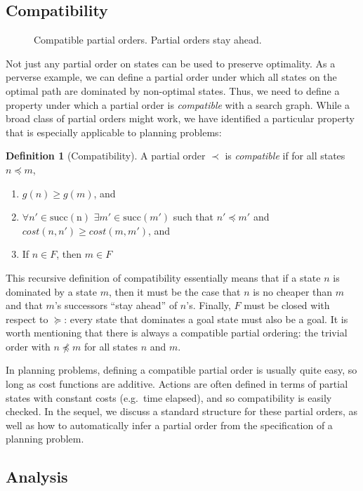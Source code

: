 \documentclass[letterpaper]{article}
\theoremstyle{plain} \newtheorem{theorem}{Theorem} \newtheorem{proposition}{Proposition} \newtheorem{lemma}{Lemma}
\theoremstyle{definition} \newtheorem{definition}{Definition} \newtheorem{conjecture}{Conjecture} \newtheorem*{example}{Example}
\theoremstyle{remark} \newtheorem*{remark}{Remark} \newtheorem*{note}{Note} \newtheorem{case}{Case}
\begin{document}
\subsection{Compatibility}
\begin{figure}
  \caption{Compatible partial orders. Partial orders stay ahead.}
\end{figure}

Not just any partial order on states can be used to preserve optimality. As a perverse
example, we can define a partial order under which all states on the optimal path
are dominated by non-optimal states. Thus, we need to define a property
under which a partial order is \textit{compatible} with a search graph. While
a broad class of partial orders might work, we have identified a particular 
property that is especially applicable to planning problems:

\begin{definition}[Compatibility]
	\label{def-compatibility}
  A partial order $\prec$ is \textit{compatible} if for all states $n \preceq m$,
  \begin{enumerate}
    \item $g(n) \ge g(m)$, and 
    \item $\forall n' \in \mathrm{succ(n)}$ $\exists m' \in
      \mathrm{succ}(m')$ such that $n' \preceq m'$ and
      $cost(n,n') \ge cost(m, m')$, and
    \item If $n \in F$, then $m \in F$
  \end{enumerate}
\end{definition}
This recursive definition of compatibility essentially means that
if a state $n$ is dominated by a state $m$, then it must be the
case that $n$ is no cheaper than $m$ and that $m$'s successors
``stay ahead'' of $n$'s. Finally, $F$ must be closed with respect
to $\succeq$: every state that dominates a goal state must also be
a goal. It is worth mentioning that there is always a compatible
partial ordering: the trivial order with $n \npreceq m$ for all
states $n$ and $m$.

In planning problems, defining a compatible partial order is usually
quite easy, so long as cost functions are additive.  Actions are
often defined in terms of partial states with constant costs (e.g.\
time elapsed), and so compatibility is easily checked.  In the
sequel, we discuss a standard structure for these partial orders,
as well as how to automatically infer a partial order from the
specification of a planning problem.

\subsection{Analysis}
\end{document}
